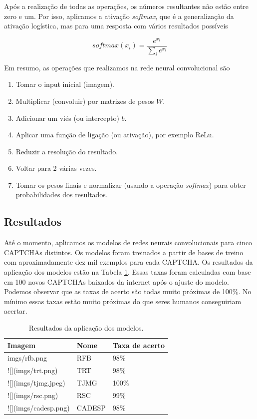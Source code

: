 \documentclass[12pt,]{report}
\providecommand{\tightlist}{%
  \setlength{\itemsep}{0pt}\setlength{\parskip}{0pt}}
\begin{document}
Após a realização de todas as operações, os números resultantes não
estão entre zero e um. Por isso, aplicamos a ativação \emph{softmax},
que é a generalização da ativação logística, mas para uma resposta com
vários resultados possíveis

\[
softmax(x_i) = \frac{e^{x_i}}{\sum_ie^{x_i}}
\]

Em resumo, as operações que realizamos na rede neural convolucional são

\begin{enumerate}
\def\labelenumi{\arabic{enumi}.}
\tightlist
\item
  Tomar o input inicial (imagem).
\item
  Multiplicar (convoluir) por matrizes de pesos \(W\).
\item
  Adicionar um viés (ou intercepto) \(b\).
\item
  Aplicar uma função de ligação (ou ativação), por exemplo ReLu.
\item
  Reduzir a resolução do resultado.
\item
  Voltar para 2 várias vezes.
\item
  Tomar os pesos finais e normalizar (usando a operação \emph{softmax})
  para obter probabilidades dos resultados.
\end{enumerate}

\subsection{Resultados}\label{resultados}

Até o momento, aplicamos os modelos de redes neurais convolucionais para
cinco CAPTCHAs distintos. Os modelos foram treinados a partir de bases
de treino com aproximadamente dez mil exemplos para cada CAPTCHA. Os
resultados da aplicação dos modelos estão na Tabela
\ref{tab:resultados}. Essas taxas foram calculadas com base em 100 novos
CAPTCHAs baixados da internet após o ajuste do modelo. Podemos observar
que as taxas de acerto são todas muito próximas de 100\%. No mínimo
essas taxas estão muito próximas do que seres humanos conseguiriam
acertar.

\begin{table}

\caption{\label{tab:resultados}Resultados da aplicação dos modelos.}
\centering
\begin{tabular}[t]{l|l|l}
\hline
Imagem & Nome & Taxa de acerto\\
\hline
imgs/rfb.png & RFB & 98\%\\
\hline
![](imgs/trt.png) & TRT & 98\%\\
\hline
![](imgs/tjmg.jpeg) & TJMG & 100\%\\
\hline
![](imgs/rsc.png) & RSC & 99\%\\
\hline
![](imgs/cadesp.png) & CADESP & 98\%\\
\hline
\end{tabular}
\end{table}
\end{document}
